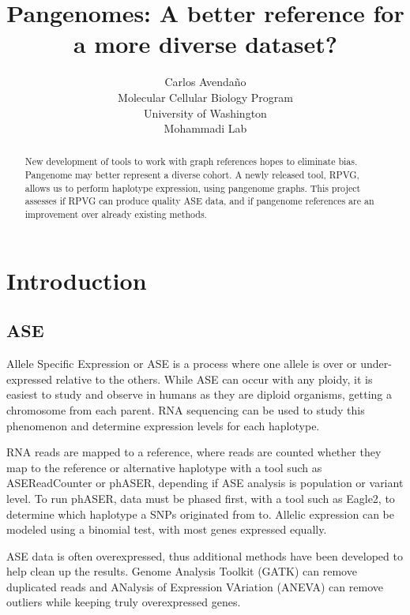 \documentclass{article}
\title{Pangenomes: A better reference for a more diverse dataset?}
\author{%
  Carlos Avendaño \\
  Molecular Cellular Biology Program\\
  University of Washington\\
  Mohammadi Lab \\
}
\begin{document}
\maketitle

\begin{abstract}
New development of tools to work with graph references hopes to eliminate
bias. Pangenome may better represent a diverse cohort. A newly released tool,
RPVG, allows us to perform haplotype expression, using pangenome graphs. This 
project assesses if RPVG can produce quality ASE data, and if pangenome
references are an improvement over already existing methods. 

\end{abstract}


\section{Introduction}

\subsection{ASE}

Allele Specific Expression or ASE is a process where one allele is over or under-expressed relative 
to the others. While ASE can occur with any ploidy, it is easiest to study and observe in humans 
as they are diploid organisms, getting a chromosome from each parent. RNA sequencing can be used to 
study this phenomenon and determine expression levels for each haplotype. \citep{Castel_2015}

RNA reads are mapped to a reference, where reads are counted whether they map
to the reference or alternative haplotype with a tool such as ASEReadCounter or phASER, depending
if ASE analysis is population or variant level. \citep{Castel_2015} To run phASER, data must be phased
first, with a tool such as Eagle2, to determine which haplotype a SNPs originated from to. \citep{Loh_2016} 
Allelic expression can be modeled using a binomial test, with most genes expressed equally. 

ASE data is often overexpressed, thus additional methods have been developed to help clean up 
the results. Genome Analysis Toolkit (GATK) can remove duplicated reads and 
ANalysis of Expression VAriation (ANEVA) can remove outliers while keeping truly overexpressed genes. \citep{McKenna_2010} 
\citep{Mohammadi_2019_Science}  
\end{document}
